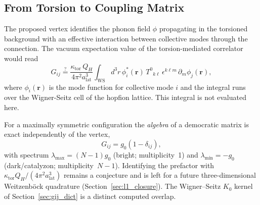 \documentclass[11pt,letterpaper]{article}
\begin{document}
\subsection{From Torsion to Coupling Matrix}

The proposed vertex identifies the phonon field $\phi$ propagating in the torsioned background with an effective interaction between collective modes through the connection. The vacuum expectation value of the torsion-mediated correlator would read
\begin{equation}
G_{ij} \stackrel{?}{=} \frac{\kappa_{\text{tor}}\, Q_H}{4\pi^2 a_{\text{lat}}^3} \int_{\text{WS}} d^3r\, \phi_i^*(\mathbf{r})\, T^{0}{}_{k\ell}\, \epsilon^{k\ell m}\, \partial_m \phi_j(\mathbf{r}),
\end{equation}
where $\phi_i(\mathbf{r})$ is the mode function for collective mode $i$ and the integral runs over the Wigner-Seitz cell of the hopfion lattice. This integral is not evaluated here.

For a maximally symmetric configuration the \emph{algebra} of a democratic matrix is exact independently of the vertex,
\begin{equation}
G_{ij} = g_0 (1 - \delta_{ij}),
\end{equation}
with spectrum $\lambda_{\max}=(N-1)g_0$ (bright; multiplicity~1) and $\lambda_{\min}=-g_0$ (dark/catalyzon; multiplicity~$N-1$). Identifying the prefactor with $\kappa_{\text{tor}} Q_H/(4\pi^2 a_{\mathrm{lat}}^3)$ remains a conjecture and is left for a future three-dimensional Weitzenb\"ock quadrature (Section~\ref{sec:l1_closure}). The Wigner--Seitz $K_0$ kernel of Section~\ref{sec:gij_dict} is a distinct computed overlap.
\end{document}
